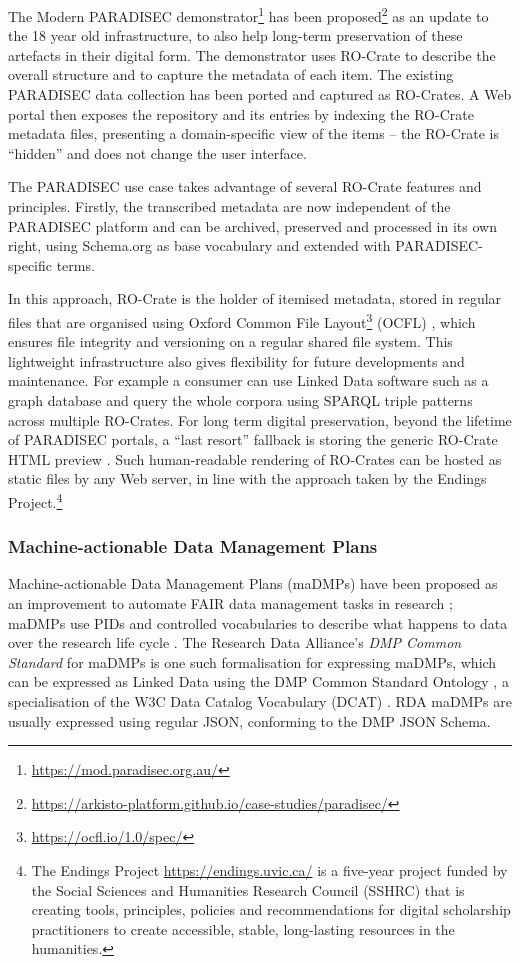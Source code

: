 The Modern PARADISEC demonstrator\footnote{\url{https://mod.paradisec.org.au/}} has
been
proposed\footnote{\url{https://arkisto-platform.github.io/case-studies/paradisec/}}
as an update to the 18 year old infrastructure, to also help long-term
preservation of these artefacts in their digital form. The demonstrator
uses RO-Crate to describe the overall structure and to capture the
metadata of each item. The existing PARADISEC data collection has been
ported and captured as RO-Crates. A Web portal then exposes the
repository and its entries by indexing the RO-Crate metadata files,
presenting a domain-specific view of the items -- the RO-Crate is
``hidden'' and does not change the user interface.


The PARADISEC use case takes advantage of several RO-Crate features and
principles. Firstly, the transcribed metadata are now independent of the
PARADISEC platform and can be archived, preserved and processed in its
own right, using Schema.org as base vocabulary and extended with
PARADISEC-specific terms.

In this approach, RO-Crate is the holder of itemised metadata, stored in
regular files that are organised using
Oxford Common File
Layout\footnote{\url{https://ocfl.io/1.0/spec/}} (OCFL)
\cite{ch5-96}, which ensures file integrity
and versioning on a regular shared file system. This lightweight
infrastructure also gives flexibility for future developments and
maintenance. For example a consumer can use Linked Data software such as
a graph database and query the whole corpora using SPARQL triple
patterns across multiple RO-Crates. For long term digital preservation,
beyond the lifetime of PARADISEC portals, a ``last resort'' fallback is
storing the generic RO-Crate HTML preview
\cite{ch5-95}. Such
human-readable rendering of RO-Crates can be hosted as static files by
any Web server, in line with the approach taken by the Endings
Project.\footnote{The Endings Project \url{https://endings.uvic.ca/} 
  is a five-year project funded by the Social Sciences and Humanities
  Research Council (SSHRC) that is creating tools, principles, policies
  and recommendations for digital scholarship practitioners to create
  accessible, stable, long-lasting resources in the humanities.}

\subsubsection{Machine-actionable Data Management Plans}\label{ch5:dmp}

Machine-actionable Data Management Plans (maDMPs) have been proposed as
an improvement to automate FAIR data management tasks in research
\cite{ch5-88}; maDMPs
use PIDs and controlled vocabularies to describe what happens to data
over the research life cycle
\cite{Cardoso 2020a}. The
Research Data Alliance's \emph{DMP Common Standard} for maDMPs
\cite{ch5-121} is one such
formalisation for expressing maDMPs, which can be expressed as Linked
Data using the DMP Common Standard Ontology
\cite{Cardoso 2020b}, a
specialisation of the W3C Data Catalog Vocabulary (DCAT)
\cite{DCAT2 2020}.
RDA maDMPs are usually expressed using regular JSON, conforming to the
DMP JSON Schema.

